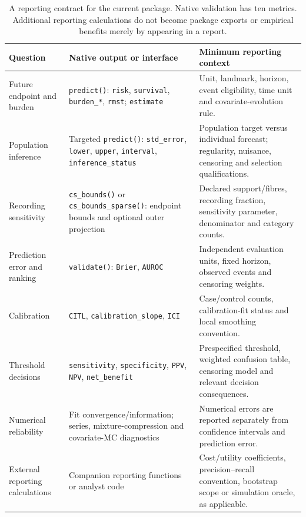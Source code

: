 \documentclass[article,nojss]{jss}
\newcommand{\code}[1]{\texttt{#1}}
\begin{document}
\begin{table}[tbp]\centering\small
\begin{tabular}{>{\raggedright\arraybackslash}p{}>{\raggedright\arraybackslash}p{}>{\raggedright\arraybackslash}p{}}\toprule
Question & Native output or interface & Minimum reporting context \\ \midrule
Future endpoint and burden & \code{predict()}: \code{risk}, \code{survival}, \code{burden\_*}, \code{rmst}; \code{estimate} & Unit, landmark, horizon, event eligibility, time unit and covariate-evolution rule. \\
Population inference & Targeted \code{predict()}: \code{std\_error}, \code{lower}, \code{upper}, \code{interval}, \code{inference\_status} & Population target versus individual forecast; regularity, nuisance, censoring and selection qualifications. \\
Recording sensitivity & \code{cs\_bounds()} or \code{cs\_bounds\_sparse()}: endpoint bounds and optional outer projection & Declared support/fibres, recording fraction, sensitivity parameter, denominator and category counts. \\
Prediction error and ranking & \code{validate()}: \code{Brier}, \code{AUROC} & Independent evaluation units, fixed horizon, observed events and censoring weights. \\
Calibration & \code{CITL}, \code{calibration\_slope}, \code{ICI} & Case/control counts, calibration-fit status and local smoothing convention. \\
Threshold decisions & \code{sensitivity}, \code{specificity}, \code{PPV}, \code{NPV}, \code{net\_benefit} & Prespecified threshold, weighted confusion table, censoring model and relevant decision consequences. \\
Numerical reliability & Fit convergence/information; series, mixture-compression and covariate-MC diagnostics & Numerical errors are reported separately from confidence intervals and prediction error. \\
External reporting calculations & Companion reporting functions or analyst code & Cost/utility coefficients, precision--recall convention, bootstrap scope or simulation oracle, as applicable. \\
\bottomrule\end{tabular}
\caption{A reporting contract for the current package. Native validation has ten metrics. Additional reporting calculations do not become package exports or empirical benefits merely by appearing in a report.}\label{tab:reporting}
\end{table}
\end{document}
